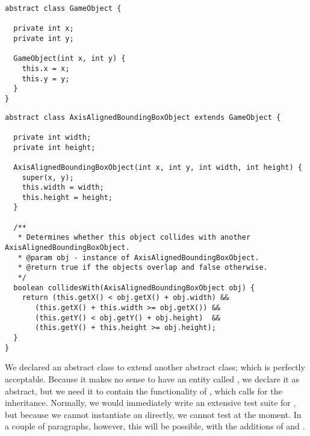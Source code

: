 \begin{lstlisting}[language=MyJava]
abstract class GameObject {
  
  private int x;
  private int y;

  GameObject(int x, int y) {
    this.x = x;
    this.y = y;
  }
}
\end{lstlisting}

\enlargethispage{2\baselineskip}
\begin{lstlisting}[language=Myjava]
abstract class AxisAlignedBoundingBoxObject extends GameObject {
  
  private int width;
  private int height;

  AxisAlignedBoundingBoxObject(int x, int y, int width, int height) {
    super(x, y);
    this.width = width;
    this.height = height;
  }

  /**
   * Determines whether this object collides with another AxisAlignedBoundingBoxObject.
   * @param obj - instance of AxisAlignedBoundingBoxObject.
   * @return true if the objects overlap and false otherwise.
   */
  boolean collidesWith(AxisAlignedBoundingBoxObject obj) {
    return (this.getX() < obj.getX() + obj.width) &&
	   (this.getX() + this.width >= obj.getX()) &&
 	   (this.getY() < obj.getY() + obj.height)  &&
	   (this.getY() + this.height >= obj.height); 
  }
}
\end{lstlisting}

We declared an abstract class to extend another abstract class; which is perfectly acceptable. Because it makes no sense to have an entity called , we declare it as abstract, but we need it to contain the functionality of , which calls for the inheritance. Normally, we would immediately write an extensive test suite for , but because we cannot instantiate an  directly, we cannot test  at the moment. In a couple of paragraphs, however, this will be possible, with the additions of  and .

